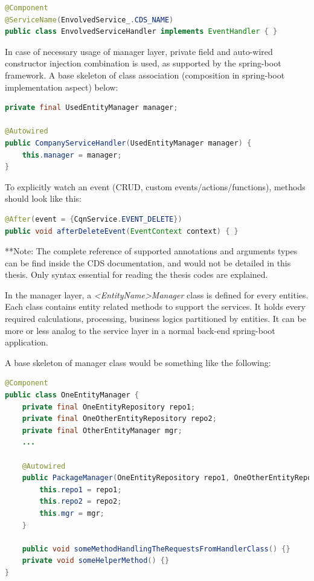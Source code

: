 \begin{lstlisting}[language={java}]
@Component
@ServiceName(EnvolvedService_.CDS_NAME)
public class EnvolvedServiceHandler implements EventHandler { }
\end{lstlisting}

In case of necessary usage of manager layer, private field and auto-wired constructor injection combination is used, as supported by the spring-boot framework. A base skeleton of class association (composition in spring-boot implementation aspect) below:

\begin{lstlisting}[language={java}]
private final UsedEntityManager manager;

@Autowired
public CompanyServiceHandler(UsedEntityManager manager) {
    this.manager = manager;
}
\end{lstlisting}

To explicitly watch an event (CRUD, custom events/actions/functions), methods should look like this:
\begin{lstlisting}[language={java}]
@After(event = {CqnService.EVENT_DELETE})
public void afterDeleteEvent(EventContext context) { }
\end{lstlisting}

\bigskip
**Note: The complete reference of supported annotations and arguments types can be find inside the CDS documentation, and would not be detailed in this thesis. Only syntax essential for reading the thesis codes are explained.

\bigskip
In the manager layer, a \textit{<EntityName>Manager} class is defined for every entities. Each class contains entity related methods to support the services. It holds every required calculations, processing, business logics partitioned by entities. It can be more or less analog to the service layer in a normal back-end spring-boot application.

A base skeleton of manager class would be something like the following:

\begin{lstlisting}[language={java}]
@Component
public class OneEntityManager {
    private final OneEntityRepository repo1;
    private final OneOtherEntityRepository repo2;
    private final OtherEntityManager mgr;
    ...

    @Autowired
    public PackageManager(OneEntityRepository repo1, OneOtherEntityRepository repo2, OtherEntityManager mgr) {
        this.repo1 = repo1;
        this.repo2 = repo2;
        this.mgr = mgr;
    }

    public void someMethodHandlingTheRequestsFromHandlerClass() {}
    private void someHelperMethod() {}
}
\end{lstlisting}


